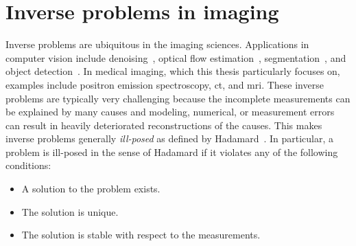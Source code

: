 \section{Inverse problems in imaging}%
\label{sec:inverse problems in imaging}
Inverse problems are ubiquitous in the imaging sciences.
Applications in computer vision include denoising~\cite{rudin_nonlinear_1992}, optical flow estimation~\cite{Hur2020}, segmentation~\cite{CHENG20012259}, and object detection~\cite{PIZLO20013145}.
In medical imaging, which this thesis particularly focuses on, examples include positron emission spectroscopy, \xray{} \gls{ct}, and \gls{mri}.
These inverse problems are typically very challenging because the incomplete measurements can be explained by many causes and modeling, numerical, or measurement errors can result in heavily deteriorated reconstructions of the causes.
This makes inverse problems generally \emph{ill-posed} as defined by Hadamard~\cite{hadamard_lectures_1953}.
In particular, a problem is ill-posed in the sense of Hadamard if it violates any of the following conditions:
\begin{itemize}
	\item A solution to the problem exists.
	\item The solution is unique.
	\item The solution is stable with respect to the measurements.
\end{itemize}

